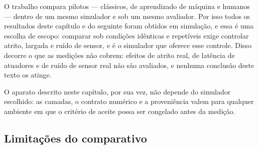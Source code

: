 O trabalho compara pilotos --- clássicos, de aprendizado de máquina e humanos
--- dentro de um mesmo simulador e sob um mesmo avaliador. Por isso todos os
resultados deste capítulo e do seguinte foram obtidos em simulação, e essa é uma
escolha de escopo: comparar sob condições idênticas e repetíveis exige controlar
atrito, largada e ruído de sensor, e é o simulador que oferece esse controle.
Disso decorre o que as medições não cobrem: efeitos de atrito real, de latência
de atuadores e de ruído de sensor real não são avaliados, e nenhuma conclusão
deste texto os atinge.

O aparato descrito neste capítulo, por sua vez, não depende do simulador
escolhido: as camadas, o contrato numérico e a proveniência valem para qualquer
ambiente em que o critério de aceite possa ser congelado antes da medição.

\subsection{Limitações do comparativo}\label{sec:val-limitacoes-comparativo}

